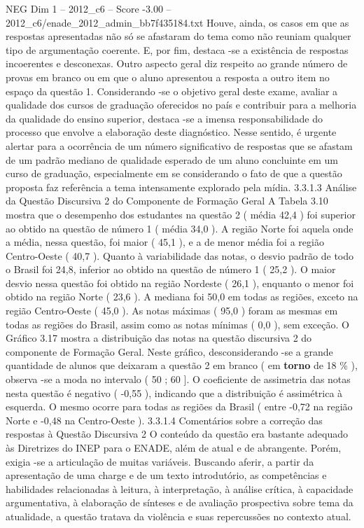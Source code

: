 \begin{textsample}{NEG Dim 1 – 2012\_c6 – Score -3.00 – 2012\_c6/enade\_2012\_admin\_bb7f435184.txt}
Houve, ainda, os casos em que as respostas apresentadas não só se afastaram do tema como não reuniam qualquer tipo de argumentação coerente.
E, por fim, destaca -se a existência de respostas incoerentes e desconexas.
Outro aspecto geral diz respeito ao grande número de provas em branco ou em que o aluno apresentou a resposta a outro item no espaço da questão 1.
Considerando -se o objetivo geral deste exame, avaliar a qualidade dos cursos de graduação oferecidos no país e contribuir para a melhoria da qualidade do ensino superior, destaca -se a imensa responsabilidade do processo que envolve a elaboração deste diagnóstico.
Nesse sentido, é urgente alertar para a ocorrência de um número significativo de respostas que se afastam de um padrão mediano de qualidade esperado de um aluno concluinte em um curso de graduação, especialmente em se considerando o fato de que a questão proposta faz referência a tema intensamente explorado pela mídia. 3.3.1.3 Análise da Questão Discursiva 2 do Componente de Formação Geral A Tabela 3.10 mostra que o desempenho dos estudantes na questão 2 ( média 42,4 ) foi superior ao obtido na questão de número 1 ( média 34,0 ).
A região Norte foi aquela onde a média, nessa questão, foi maior ( 45,1 ), e a de menor média foi a região Centro-Oeste ( 40,7 ).
Quanto à variabilidade das notas, o desvio padrão de todo o Brasil foi 24,8, inferior ao obtido na questão de número 1 ( 25,2 ).
O maior desvio nessa questão foi obtido na região Nordeste ( 26,1 ), enquanto o menor foi obtido na região Norte ( 23,6 ).
A mediana foi 50,0 em todas as regiões, exceto na região Centro-Oeste ( 45,0 ).
As notas máximas ( 95,0 ) foram as mesmas em todas as regiões do Brasil, assim como as notas mínimas ( 0,0 ), sem exceção.
O Gráfico 3.17 mostra a distribuição das notas na questão discursiva 2 do componente de Formação Geral.
Neste gráfico, desconsiderando -se a grande quantidade de alunos que deixaram a questão 2 em branco ( em \textbf{torno} de 18 \% ), observa -se a moda no intervalo ( 50 ; 60 ].
O coeficiente de assimetria das notas nesta questão é negativo ( -0,55 ), indicando que a distribuição é assimétrica à esquerda.
O mesmo ocorre para todas as regiões da Brasil ( entre -0,72 na região Norte e -0,48 na Centro-Oeste ). 3.3.1.4 Comentários sobre a correção das respostas à Questão Discursiva 2 O conteúdo da questão era bastante adequado às Diretrizes do INEP para o ENADE, além de atual e de abrangente.
Porém, exigia -se a articulação de muitas variáveis.
Buscando aferir, a partir da apresentação de uma charge e de um texto introdutório, as competências e habilidades relacionadas à leitura, à interpretação, à análise crítica, à capacidade argumentativa, à elaboração de sínteses e de avaliação prospectiva sobre tema da atualidade, a questão tratava da violência e suas repercussões no contexto atual.

\end{textsample}
